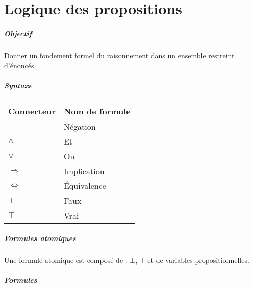 \documentclass[11pt,twoside,openright,a4paper]{report}
\begin{document}
\pagestyle{fancy}

\chapter{Logique des propositions} %
\label{cha:logique_des_propositions}

\paragraph{Objectif} %
\label{par:objectif}

Donner un fondement formel du raisonnement dans un ensemble restreint d’énoncés


\paragraph{Syntaxe} %
\label{par:syntaxe}

\begin{center}
	\begin{tabular}{ | l | l | }
		\hline
		Connecteur & Nom de formule \\
		\hline
		$\neg$ & Négation \\
		\hline
		$\land$ & Et \\
		\hline
		$\lor$ & Ou \\
		\hline
		$\Rightarrow$ & Implication \\
		\hline
		$\Leftrightarrow$ & Équivalence \\
		\hline
		$\bot$ & Faux \\
		\hline
		$\top$ & Vrai \\
		\hline
	\end{tabular}
\end{center}


\paragraph{Formules atomiques} %
\label{par:formules_atomiques}

Une formule atomique est composé de : $\bot$, $\top$ et de variables propositionnelles.


\paragraph{Formules} %
\label{par:formules}
\end{document}
